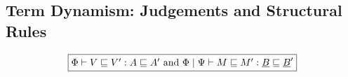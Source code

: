 \documentclass[acmsmall,screen,12pt]{acmart}
\renewcommand{\u}{\underline}
\newcommand{\ltdyn}{\sqsubseteq}
\begin{document}




\subsection{Term Dynamism: Judgements and Structural Rules}

\begin{figure}
  \begin{small}
  \[
  \begin{array}{c}
    \framebox{$\Phi \vdash V \ltdyn V' : A \ltdyn A'$ and $\Phi \mid \Psi \vdash M \ltdyn M' : \u B \ltdyn \u B'$}
    \\\\
    

\end{array}\]
\end{small}
\end{figure}
\end{document}
